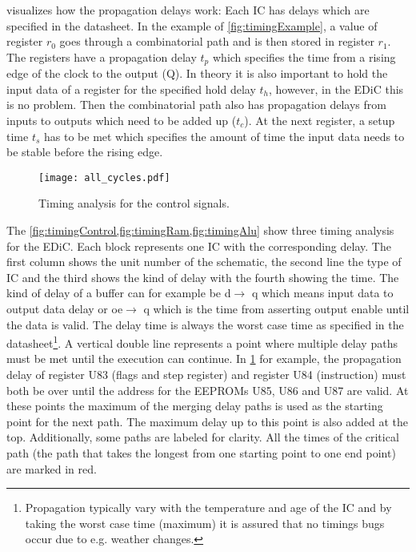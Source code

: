  visualizes how the propagation delays work:
Each \gls{IC} has delays which are specified in the datasheet.
In the example of \cref{fig:timingExample}, a value of register $r_0$ goes through a combinatorial path and is then stored in register $r_1$.
The registers have a propagation delay $t_p$ which specifies the time from a rising edge of the clock to the output (Q).
In theory it is also important to hold the input data of a register for the specified hold delay $t_h$, however, in the \gls{EDiC} this is no problem.
Then the combinatorial path also has propagation delays from inputs to outputs which need to be added up ($t_c$).
At the next register, a setup time $t_s$ has to be met which specifies the amount of time the input data needs to be stable before the rising edge.

\begin{figure}[t]
  \centering
  \texttt{[image: all\_cycles.pdf]}
  \caption{Timing analysis for the control signals.}
  \label{fig:timingControl}
\end{figure}
The \cref{fig:timingControl,fig:timingRam,fig:timingAlu} show three timing analysis for the \gls{EDiC}.
Each block represents one \gls{IC} with the corresponding delay.
The first column shows the unit number of the schematic, the second line the type of \gls{IC} and the third shows the kind of delay with the fourth showing the time.
The kind of delay of a buffer can for example be d$\rightarrow$ q which means input data to output data delay or oe$\rightarrow$ q which is the time from asserting output enable until the data is valid.
The delay time is always the worst case time as specified in the datasheet\footnote{Propagation typically vary with the temperature and age of the \gls{IC} and by taking the worst case time (maximum) it is assured that no timings bugs occur due to e.g. weather changes.}.
A vertical double line represents a point where multiple delay paths must be met until the execution can continue.
In \cref{fig:timingControl} for example, the propagation delay of register U83 (flags and step register) and register U84 (instruction) must both be over until the address for the \glspl{EEPROM} U85, U86 and U87 are valid.
At these points the maximum of the merging delay paths is used as the starting point for the next path.
The maximum delay up to this point is also added at the top.
Additionally, some paths are labeled for clarity.
All the times of the critical path (the path that takes the longest from one starting point to one end point) are marked in red.

